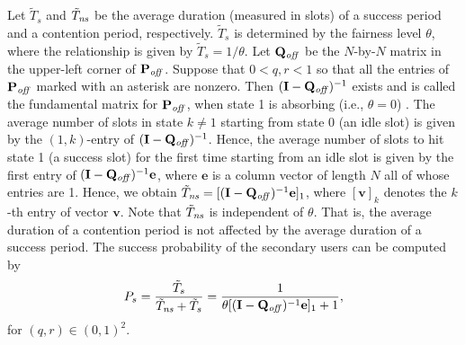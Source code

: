 \documentclass[12pt,draftclsnofoot,onecolumn]{IEEEtran}
\begin{document}
Let $\tilde{T}_s$ and $\tilde{T}_{\textrm{\emph{ns}}}$ be the average duration
(measured in slots) of a success period and a contention period, respectively.
$\tilde{T}_s$ is determined by the fairness level $\theta$, where the relationship is given by
$\tilde{T}_s = 1/\theta$.
Let $\mathbf{Q}_{\textrm{\emph{off}}}$ be the $N$-by-$N$ matrix in the upper-left
corner of $\mathbf{P}_{\textrm{\emph{off}}}$. Suppose that $0 < q,r < 1$ so that all the
entries of $\mathbf{P}_{\textrm{\emph{off}}}$ marked with an asterisk are nonzero.
Then $(\mathbf{I} - \mathbf{Q}_{\textrm{\emph{off}}})^{-1}$ exists and is called the
fundamental matrix for $\mathbf{P}_{\textrm{\emph{off}}}$,
when state 1 is absorbing (i.e., $\theta = 0$) \cite{grinstead}.
The average number of slots in state $k \neq 1$ starting from state 0 (an idle slot) is given by
the $(1,k)$-entry of $(\mathbf{I} - \mathbf{Q}_{\textrm{\emph{off}}})^{-1}$. Hence,
the average number of slots to hit state 1 (a success slot) for the first time
starting from an idle slot is given by
the first entry of $(\mathbf{I} - \mathbf{Q}_{\textrm{\emph{off}}})^{-1} \mathbf{e}$,
where $\mathbf{e}$ is a column vector of length $N$ all of whose entries are 1.
Hence, we obtain $\tilde{T}_{\textrm{\emph{ns}}} = [(\mathbf{I} - \mathbf{Q}_{\textrm{\emph{off}}})^{-1} \mathbf{e}]_1$,
where $[\mathbf{v}]_k$ denotes the $k$-th entry of vector $\mathbf{v}$.
Note that $\tilde{T}_{\textrm{\emph{ns}}}$ is independent of $\theta$. That is, the average duration of a contention
period is not affected by the average duration of a success period.
The success probability of the secondary users can be computed by
\begin{align} \label{eq:psuc}
P_s = \frac{\tilde{T}_s}{\tilde{T}_{\textrm{\emph{ns}}} + \tilde{T}_s}
= \frac{1}{\theta [(\mathbf{I} - \mathbf{Q}_{\textrm{\emph{off}}})^{-1} \mathbf{e}]_1 + 1},
\end{align}
for $(q,r) \in (0,1)^2$.
\end{document}
